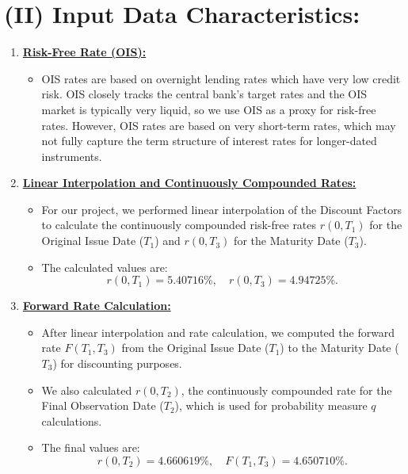 \documentclass[12pt,a4paper]{article}
\begin{document}
\section*{(II) Input Data Characteristics:}
\begin{enumerate}
\item \underline{\textbf{Risk-Free Rate (OIS):}}
	\begin{itemize}
		\item OIS rates are based on overnight lending rates which have very low credit risk. OIS closely tracks the central bank’s target rates and the OIS market is typically very liquid, so we use OIS as a proxy for risk-free rates. However, OIS rates are based on very short-term rates, which may not fully capture the term structure of interest rates for longer-dated instruments.
	\end{itemize}

\item \underline{\textbf{Linear Interpolation and Continuously Compounded Rates:}}
	\begin{itemize}
		\item For our project, we performed linear interpolation of the Discount Factors to calculate the continuously compounded risk-free rates \( r(0, T_1) \) for the Original Issue Date (\( T_1 \)) and \( r(0, T_3) \) for the Maturity Date (\( T_3 \)).
		\item The calculated values are:
		\[
		r(0, T_1) = 5.40716\%, \quad r(0, T_3) = 4.94725\%.
		\]
	\end{itemize}

\item \underline{\textbf{Forward Rate Calculation:}}
	\begin{itemize}
		\item After linear interpolation and rate calculation, we computed the forward rate \( F(T_1, T_3) \) from the Original Issue Date (\( T_1 \)) to the Maturity Date (\( T_3 \)) for discounting purposes.
		\item We also calculated \( r(0, T_2) \), the continuously compounded rate for the Final Observation Date (\( T_2 \)), which is used for probability measure \( q \) calculations.
		\item The final values are:
		\[
		r(0, T_2) = 4.660619\%, \quad F(T_1, T_3) = 4.650710\%.
		\]
	\end{itemize}


\end{enumerate}
\end{document}
